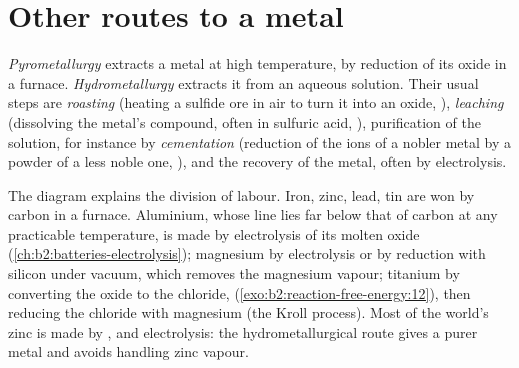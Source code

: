 \section{Other routes to a metal}

\begin{definition}\label{def:b2:ellingham:metallurgy}
\emph{Pyrometallurgy} extracts a metal at high
temperature, by reduction of its oxide in a furnace. \emph{Hydrometallurgy}
extracts it from an aqueous solution. Their usual steps are
\emph{roasting} (heating a sulfide ore in air to turn it into
an oxide, ), \emph{leaching}
(dissolving the metal's compound, often in sulfuric acid, ), purification of the solution, for instance by
\emph{cementation} (reduction of the ions of a nobler metal
by a powder of a less noble one, ), and the
recovery of the metal, often by electrolysis.
\end{definition}

The diagram explains the division of labour. Iron, zinc, lead, tin are won by
carbon in a furnace. Aluminium, whose line lies far below that of carbon at any
practicable temperature, is made by electrolysis of its molten oxide
(\cref{ch:b2:batteries-electrolysis}); magnesium by electrolysis or by
reduction with silicon under vacuum, which removes the magnesium vapour;
titanium by converting the oxide to the chloride,  (\cref{exo:b2:reaction-free-energy:12}), then reducing the chloride with
magnesium (the Kroll process). Most of the world's zinc is made by ,
 and electrolysis: the hydrometallurgical route gives a purer metal and
avoids handling zinc vapour.

